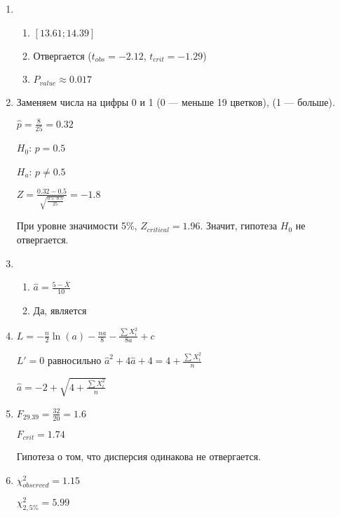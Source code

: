 \begin{enumerate}
\item
\begin{enumerate}
\item $[13.61;14.39]$
\item Отвергается ($t_{obs} = -2.12$, $t_{crit} = -1.29$)
\item $P_{value} \approx 0.017$
\end{enumerate}
\item Заменяем числа на цифры 0 и 1 (0 — меньше 19 цветков), (1 — больше).

$\hat{p}=\frac{8}{25}=0.32$

$H_{0}$: $p=0.5$

$H_{a}$: $p\neq 0.5$

$Z=\frac{0.32-0.5}{\sqrt{\frac{0.5\cdot 0.5}{25}}}=-1.8$

При уровне значимости 5\%, $Z_{critical}=1.96$. Значит, гипотеза $H_{0}$ не отвергается.
\item
\begin{enumerate}
\item $\hat{a}=\frac{5-\bar{X}}{10}$
\item Да, является
\end{enumerate}
\item $L=-\frac{n}{2}\ln(a)-\frac{na}{8}-\frac{\sum X_{i}^{2}}{8a}+c$

$L'=0$ равносильно $\hat{a}^{2}+4\hat{a}+4=4+\frac{\sum X_{i}^{2}}{n}$

$\hat{a}=-2+\sqrt{4+\frac{\sum X_{i}^{2}}{n}}$
\item $F_{29.39}=\frac{32}{20}=1.6$

$F_{crit}=1.74$

Гипотеза о том, что дисперсия одинакова не отвергается.
\item $\chi^{2}_{observed}=1.15$

$\chi^{2}_{2,5\%}=5.99$


\end{enumerate}
